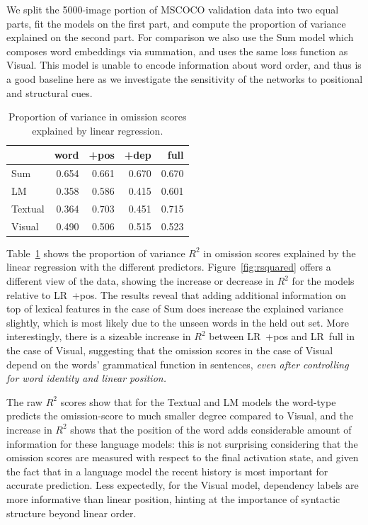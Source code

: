 \noindent We split the 5000-image portion of MSCOCO validation data into two equal parts, fit the 
models on the first part, and compute the 
proportion of variance explained on the second part. 
For comparison we also use the {\sc Sum} model which composes word
embeddings via summation, and uses the same loss function as {\sc
  Visual}. This model is unable to encode information about word
order, and thus is a good baseline here as we investigate the
sensitivity of the networks to positional and structural cues.

\begin{table}
  \centering
  \caption{Proportion of variance in omission scores explained by
    linear regression.}
    \begin{tabular}{l|rrrr}
               & word   & +pos  & +dep  & full \\\hline
     {\sc Sum}       & 0.654  & 0.661 & 0.670 & 0.670 \\
     {\sc LM}        & 0.358  & 0.586 & 0.415 & 0.601 \\
     {\sc Textual}   & 0.364  & 0.703 & 0.451 & 0.715 \\
     {\sc Visual}    & 0.490  & 0.506 & 0.515 & 0.523 \\
    \end{tabular}
    \label{tab:lr-r2}
\end{table}


Table~\ref{tab:lr-r2} shows the proportion of variance $R^2$ in omission
scores explained by the linear regression with the different predictors.
Figure~\ref{fig:rsquared} offers a different view of the data, showing
the increase or decrease in $R^2$ for the models relative to {\sc
  LR~+pos}.  
The results reveal that adding additional information on
top of lexical features in the case of {\sc Sum} does increase the
explained variance slightly, which is most likely due to the unseen words
in the held out set. More interestingly, there is a sizeable
increase in $R^2$ between {\sc LR~+pos} and {\sc LR~full} in
the case of {\sc Visual}, suggesting that 
the omission scores in the case of {\sc Visual} depend on the words'
grammatical function in sentences, {\it even after controlling for word
identity and linear position.}  

The raw $R^2$ scores show that for the {\sc Textual} and {\sc LM}
models the word-type predicts the omission-score to much smaller
degree compared to {\sc Visual}, and the increase in $R^2$ shows that
the position of the word adds considerable amount of information for
these language models: this is not surprising considering that the omission
scores are measured with respect to the final activation state, and
given the fact that in a language model the recent history is most
important for accurate prediction. Less expectedly, for the {\sc Visual} model,
dependency labels are more informative than linear position,
hinting at the importance of syntactic structure beyond linear order.

